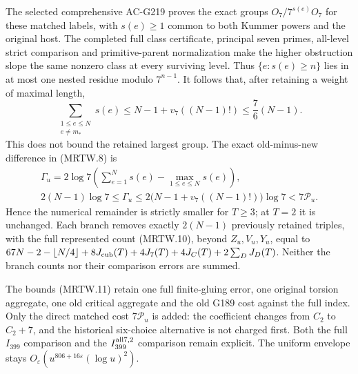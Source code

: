 \documentclass[11pt,a4paper]{article}
\theoremstyle{definition}
\theoremstyle{remark}
\begin{document}
The selected comprehensive AC-G219 proves the exact groups
$O_7/7^{s(e)}O_7$ for these matched labels, with
$s(e)\geq1$ common to both Kummer powers and the original host.
The completed full class certificate, principal seven primes,
all-level strict comparison and primitive-parent normalization
make the higher obstruction slope the same nonzero class at every
surviving level. Thus $\{e:s(e)\geq n\}$ lies in at most one
nested residue modulo $7^{n-1}$.
It follows that, after retaining a weight of maximal length,
\[
 \sum_{\substack{1\leq e\leq N\\e\ne m_*}}s(e)
 \leq N-1+v_7((N-1)!)\leq\frac76(N-1).
\]
This does not bound the retained largest group.
The exact old-minus-new difference in (MRTW.8) is
\[
 \begin{gathered}
 \Gamma_u=2\log7\left(\sum_{e=1}^{N}s(e)-\max_{1\leq e\leq N}s(e)\right),\\
 2(N-1)\log7\leq\Gamma_u
 \leq2\bigl(N-1+v_7((N-1)!)\bigr)\log7<7\mathcal P_u.
 \end{gathered}
\]
Hence the numerical remainder is strictly smaller for $T\geq3$;
at $T=2$ it is unchanged. Each branch removes exactly $2(N-1)$
previously retained triples, with the full represented count
(MRTW.10), beyond $Z_u,V_u,Y_u$, equal to
$67N-2-\lfloor N/4\rfloor+8J_{\rm cub}(T)+4J_7(T)
+4J_C(T)+2\sum_DJ_D(T)$.
Neither the branch counts nor their comparison errors are summed.

The bounds (MRTW.11) retain one full finite-gluing error, one
original torsion aggregate, one old critical aggregate and the
old G189 cost against the full index. Only the direct matched
cost $7\mathcal P_u$ is added: the coefficient changes from
$C_2$ to $C_2+7$, and the historical six-choice alternative is
not charged first. Both the full $I_{399}$ comparison and the
$I_{399}^{\rm all7,2}$ comparison remain explicit.
The uniform envelope stays
$O_\varepsilon(u^{806+16\varepsilon}(\log u)^2)$.
\end{document}
